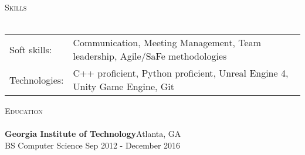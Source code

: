 \documentclass[a4paper]{article}
\newcommand{\lineunder} {
    \vspace*{-8pt} \\
    \hspace*{-18pt} \hrulefill \\
}
\newcommand{\header} [1] {
    {\hspace*{-18pt}\vspace*{6pt} \textsc{#1}}
    \vspace*{-6pt} \lineunder
}
\begin{document}
\header{Skills}
\begin{tabular}{ l l }
	Soft skills:  & Communication, Meeting Management, Team leadership, Agile/SaFe methodologies \\
	Technologies: & C++ proficient, Python proficient, Unreal Engine 4, Unity Game Engine, Git   \\
\end{tabular}
\vspace{2mm}

\header{Education}
\textbf{Georgia Institute of Technology}\hfill Atlanta, GA\\
BS Computer Science \hfill Sep 2012 - December 2016\\
\vspace{2mm}



\ 
\end{document}
